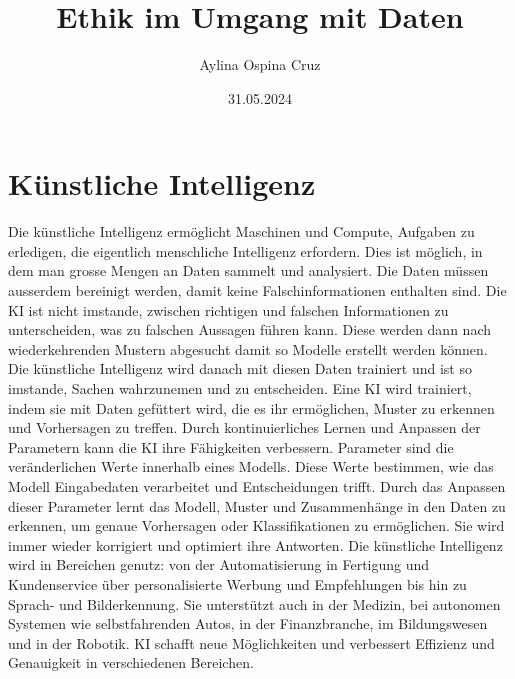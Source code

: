 \documentclass{article}
\title{Ethik im Umgang mit Daten}
\author{Aylina Ospina Cruz}
\date{31.05.2024}
\begin{document}
\maketitle



\tableofcontents


\section{Künstliche Intelligenz}

Die künstliche Intelligenz ermöglicht Maschinen und Compute,  Aufgaben zu erledigen, die eigentlich menschliche Intelligenz erfordern. Dies ist möglich, in dem man grosse Mengen an Daten sammelt und analysiert. Die Daten müssen ausserdem bereinigt werden, damit keine Falschinformationen enthalten sind. Die KI ist nicht imstande, zwischen richtigen und falschen Informationen zu unterscheiden, was zu falschen Aussagen führen kann. Diese werden dann nach wiederkehrenden Mustern abgesucht damit so Modelle erstellt werden können. Die künstliche Intelligenz wird danach mit diesen Daten trainiert und ist so imstande, Sachen wahrzunemen und zu entscheiden. Eine KI wird trainiert, indem sie mit Daten gefüttert wird, die es ihr ermöglichen, Muster zu erkennen und Vorhersagen zu treffen. Durch kontinuierliches Lernen und Anpassen der Parametern kann die KI ihre Fähigkeiten verbessern. Parameter sind die veränderlichen Werte innerhalb eines Modells. Diese Werte bestimmen, wie das Modell Eingabedaten verarbeitet und Entscheidungen trifft. Durch das Anpassen dieser Parameter lernt das Modell, Muster und Zusammenhänge in den Daten zu erkennen, um genaue Vorhersagen oder Klassifikationen zu ermöglichen. Sie wird immer wieder korrigiert und optimiert ihre Antworten. Die künstliche Intelligenz wird in Bereichen genutz: von der Automatisierung in Fertigung und Kundenservice über personalisierte Werbung und Empfehlungen bis hin zu Sprach- und Bilderkennung. Sie unterstützt auch in der Medizin, bei autonomen Systemen wie selbstfahrenden Autos, in der Finanzbranche, im Bildungswesen und in der Robotik. KI schafft neue Möglichkeiten und verbessert Effizienz und Genauigkeit in verschiedenen Bereichen.
\end{document}
